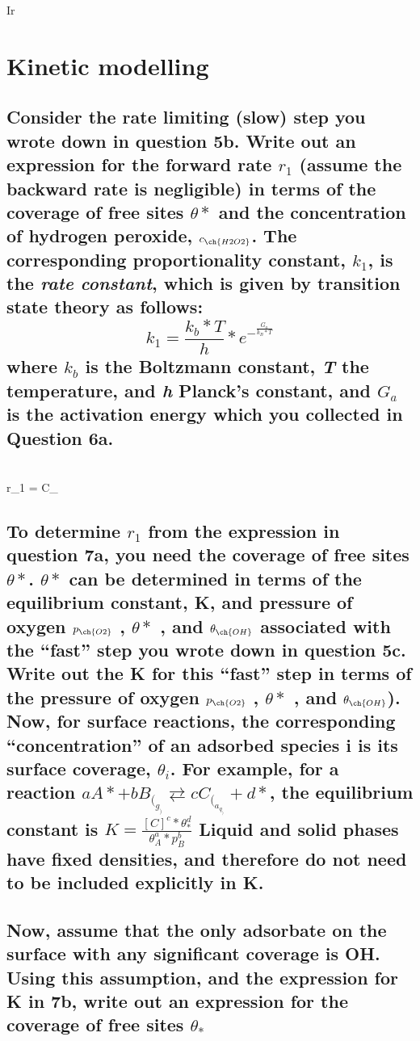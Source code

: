 Ir\documentclass{article}
\begin{document}
\section{Kinetic modelling}
\subsection{Consider the rate limiting (slow) step you wrote down in question 5b. Write out an expression for the forward rate \textbf{$r_1$} (assume the backward rate is negligible)
in terms of the coverage of free sites $\theta\ast$ and the concentration of hydrogen
peroxide, $c_\ch{H2O2}$. The corresponding proportionality constant, $k_1$, is the \textit{rate constant}, which is given by transition state theory as follows:
$$k_1=\frac{k_b*T}{h}*e^-^\frac{G_a}{k_B*T}$$
where $k_b$ is the Boltzmann constant, \textit{T} the temperature, and \textit{h} Planck’s
constant, and $G_a$ is the activation energy which you collected in Question 6a.}

\\r_{1} = C_{\cdot \theta \ast}
\subsection{To determine \textbf{$r_1$} from the expression in question 7a, you need the coverage of free sites $\theta\ast$. $\theta\ast$ can be determined in terms of the equilibrium constant, K, and pressure of oxygen $p_\ch{O2}$ , $\theta\ast$ , and $\theta_\ch{OH}$ associated with the “fast” step you wrote down in question 5c. Write out the K for this “fast” step in terms of the
pressure of oxygen $p_\ch{O2}$ , $\theta\ast$ , and $\theta_\ch{OH}$).
Now, for surface reactions, the corresponding “concentration” of an adsorbed
species i is its surface coverage, $\theta_i$. For example, for a reaction $aA\ast + bB_(_g_) ⇄
cC_(_a_q_) + d\ast$, the equilibrium constant is $K=\frac{[C]^c*\theta^d_\ast}{\theta^a_A*p^b_B}$
Liquid and solid phases have fixed densities, and therefore do not need to be
included explicitly in K.}

\subsection{Now, assume that the only adsorbate on the surface with any significant
coverage is \ast OH. Using this assumption, and the expression for K in 7b, write
out an expression for the coverage of free sites $\theta_\ast$}

\subsection{}
\end{document}

